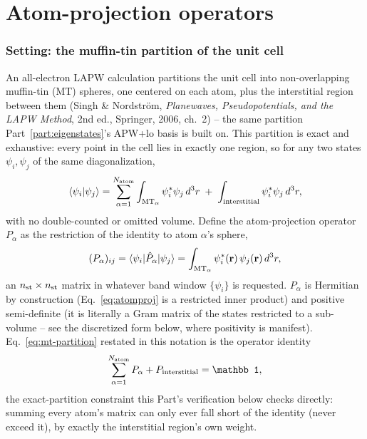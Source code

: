 \documentclass[11pt]{article}
\begin{document}
\part{Atom-projection operators}
\label{part:atomprojection}

\section{Setting: the muffin-tin partition of the unit cell}

An all-electron LAPW calculation partitions the unit cell into non-overlapping muffin-tin
(MT) spheres, one centered on each atom, plus the interstitial region between them
(Singh \& Nordstr\"om, \emph{Planewaves, Pseudopotentials, and the LAPW Method}, 2nd ed.,
Springer, 2006, ch.~2) -- the same partition Part~\ref{part:eigenstates}'s APW+lo basis is
built on. This partition is exact and exhaustive: every point in the cell lies in exactly
one region, so for any two states $\psi_i,\psi_j$ of the same diagonalization,
\begin{equation}
  \langle\psi_i|\psi_j\rangle
  = \sum_{\alpha=1}^{N_{\rm atom}} \int_{{\rm MT}_\alpha} \psi_i^*\psi_j\,d^3r
  \;+\; \int_{\rm interstitial} \psi_i^*\psi_j\,d^3r,
  \label{eq:mt-partition}
\end{equation}
with no double-counted or omitted volume. Define the atom-projection operator $P_\alpha$
as the restriction of the identity to atom $\alpha$'s sphere,
\begin{equation}
  (P_\alpha)_{ij} = \langle\psi_i|\hat P_\alpha|\psi_j\rangle
  = \int_{{\rm MT}_\alpha} \psi_i^*(\mathbf r)\,\psi_j(\mathbf r)\,d^3r,
  \label{eq:atomproj}
\end{equation}
an $n_{\rm st}\times n_{\rm st}$ matrix in whatever band window $\{\psi_i\}$ is requested.
$P_\alpha$ is Hermitian by construction (Eq.~\eqref{eq:atomproj} is a restricted inner
product) and positive semi-definite (it is literally a Gram matrix of the states
restricted to a sub-volume -- see the discretized form below, where positivity is
manifest). Eq.~\eqref{eq:mt-partition} restated in this notation is the operator identity
\begin{equation}
  \sum_{\alpha=1}^{N_{\rm atom}} P_\alpha + P_{\rm interstitial} = \mathbb 1,
  \label{eq:atomproj-partition}
\end{equation}
the exact-partition constraint this Part's verification below checks directly: summing
every atom's matrix can only ever fall short of the identity (never exceed it), by
exactly the interstitial region's own weight.
\end{document}
